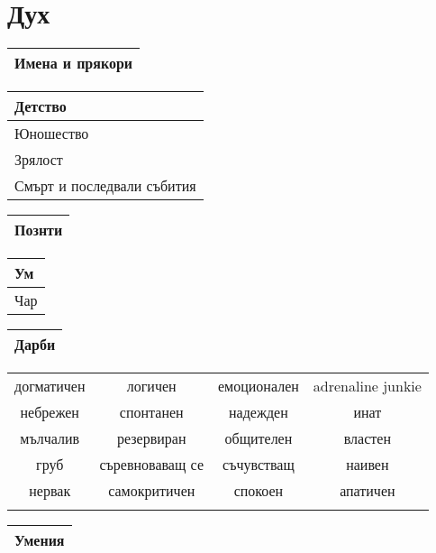 \documentclass{article}
\begin{document}
\section{Дух}
\extrarowsep=0.5cm
\noindent
\begin{tabular}{|p{\textwidth}|}
\hline
{\tiny Имена и прякори}  \\
\hline
\end{tabular}

\begin{multicols}{2}
\extrarowsep=2.5cm
\noindent
\begin{tabular}{|p{}|}
\hline
{\tiny Детство}  \\
\hline
{\tiny Юношество}  \\
\hline
{\tiny Зрялост}  \\
\hline
{\tiny Смърт и последвали събития}  \\
\hline
\end{tabular}

\extrarowsep=11.5cm
\noindent
\begin{tabular}{|p{}|}
\hline
{\tiny Познти}  \\
\hline
\end{tabular}
\end{multicols}

\begin{multicols}{2}
\extrarowsep=1cm
\begin{tabular}{|p{2cm}|}
\hline
{\tiny Ум}  \\
\hline
{\tiny Чар}  \\
\hline
\end{tabular}

\extrarowsep=4cm
\begin{tabular}{|p{4cm}|}
\hline
{\tiny Дарби}  \\
\hline
\end{tabular}

\begin{tiny}
\extrarowsep=0.5cm
\noindent
\begin{tabular}{|c c c c|}
\hline
догматичен & логичен & емоционален & adrenaline junkie  \\
небрежен & спонтанен & надежден & инат  \\
мълчалив & резервиран & общителен & властен  \\
груб & съревноваващ се & съчувстващ & наивен  \\
нервак & самокритичен & спокоен & апатичен  \\
\\
\hline
\end{tabular}
\end{tiny}

\extrarowsep=12cm
\noindent
\begin{tabular}{|p{6cm}|}
\hline
{\tiny Умения}  \\
\hline
\end{tabular}
\end{multicols}
\end{document}
